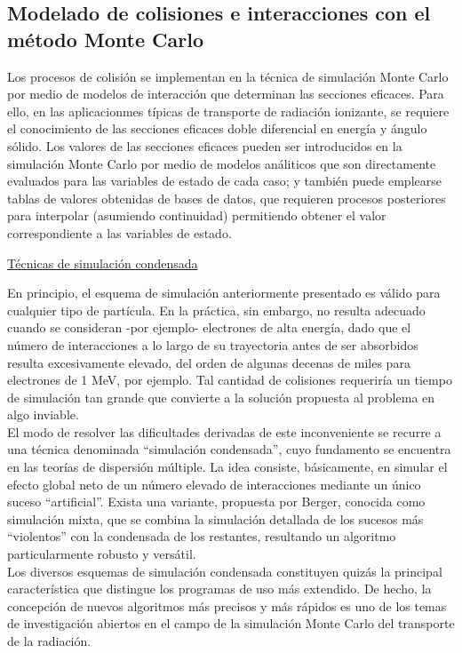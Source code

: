 \subsection{Modelado de colisiones e interacciones con el m\'etodo Monte Carlo}
\label{CapVII_11}

Los procesos de colisi\'on se implementan en la t\'ecnica de simulaci\'on Monte Carlo por medio de modelos de interacci\'on que determinan
las secciones eficaces.
%
Para ello, en las aplicacionmes t\'ipicas de transporte de radiaci\'on ionizante, se requiere el conocimiento de las secciones eficaces
doble diferencial en energ\'ia y \'angulo s\'olido.
%
Los valores de las secciones eficaces pueden ser introducidos en la simulaci\'on Monte Carlo por medio de modelos an\'aliticos que son
directamente evaluados para las variables de estado de cada caso; y tambi\'en puede emplearse tablas de valores obtenidas de bases de
datos, que requieren procesos posteriores para interpolar (asumiendo continuidad) permitiendo obtener el valor correspondiente a las
variables de estado. \\
%
%
\begin{center}
\underline{T\'ecnicas de simulaci\'on condensada}
\end{center}

En principio, el esquema de simulaci\'on anteriormente presentado es v\'alido para cualquier tipo de part\'icula.
%
En la pr\'actica, sin embargo, no resulta adecuado cuando se consideran -por ejemplo- electrones de alta energ\'ia, dado que el n\'umero
de interacciones a lo largo de su trayectoria antes de ser absorbidos resulta excesivamente elevado, del orden de algunas decenas de
miles para electrones de 1 MeV, por ejemplo.
%
Tal cantidad de colisiones requerir\'ia un tiempo de simulaci\'on tan grande que convierte a la soluci\'on propuesta al problema en algo
inviable. \\
%
%
El modo de resolver las dificultades derivadas de este inconveniente se recurre a una t\'ecnica denominada ``simulaci\'on condensada'',
cuyo fundamento se encuentra en las teor\'ias de dispersi\'on m\'ultiple.
%
La idea consiste, b\'asicamente, en simular el efecto global neto de un n\'umero elevado de interacciones mediante un \'unico suceso
``artificial''.
%
Exista una variante, propuesta por Berger, conocida como simulaci\'on mixta, que se combina la simulaci\'on detallada de los sucesos m\'as
``violentos'' con la condensada de los restantes, resultando un algoritmo particularmente robusto y vers\'atil. \\
%
%
Los diversos esquemas de simulaci\'on condensada constituyen quiz\'as la principal caracter\'istica que distingue los programas de uso
m\'as extendido.
%
De hecho, la concepci\'on de nuevos algoritmos m\'as precisos y m\'as r\'apidos es uno de los temas de investigaci\'on abiertos en el
campo de la simulaci\'on Monte Carlo del transporte de la radiaci\'on. \\
%
%
\vspace{1.0cm}

